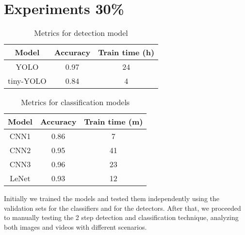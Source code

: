 \section{Experiments 30\%}

\begin{table}
	\begin{center}
		\begin{tabular}{|c|c|c|}
			\hline
			Model & Accuracy & Train time (h) \\
			\hline\hline
			YOLO & 0.97 & 24 \\
			tiny-YOLO & 0.84 & 4 \\
			\hline
		\end{tabular}
	\end{center}
	\caption{Metrics for detection model}
	\label{yolo-metrics}
\end{table}

\begin{table}
	\begin{center}
		\begin{tabular}{|c|c|c|}
			\hline
			Model & Accuracy & Train time (m) \\
			\hline\hline
			CNN1 & 0.86 & 7 \\
			CNN2 & 0.95 & 41 \\
			CNN3 & 0.96 & 23 \\
			LeNet & 0.93 & 12 \\
			\hline
		\end{tabular}
	\end{center}
	\caption{Metrics for classification models}
	\label{class-metrics}
\end{table}

Initially we trained the models and tested them independently using the validation sets for the classifiers and for the detectors. After that, we proceeded to manually testing the 2 step detection and classification technique, analyzing both images and videos with different scenarios. 



